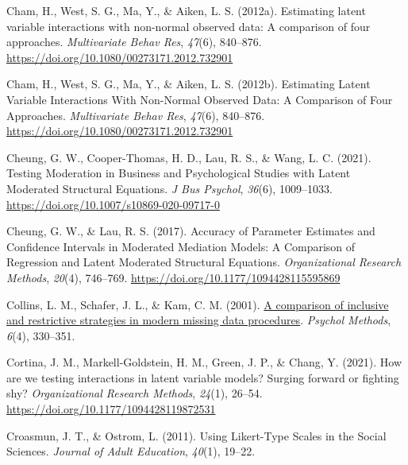 \documentclass[
  man]{apa6}
\newlength{\cslhangindent}
\newlength{\cslentryspacingunit} %
\newenvironment{CSLReferences}[2] %
 {%
  \setlength{\parindent}{0pt}
  \ifodd #1
  \let\oldpar\par
  \def\par{\hangindent=\cslhangindent\oldpar}
  \fi
  \setlength{\parskip}{#2\cslentryspacingunit}
 }%
 {}
\begin{document}
\begin{CSLReferences}{1}{0}
\leavevmode{}%
Cham, H., West, S. G., Ma, Y., \& Aiken, L. S. (2012a). Estimating latent variable interactions with non-normal observed data: {A} comparison of four approaches. \emph{Multivariate Behav Res}, \emph{47}(6), 840--876. \url{https://doi.org/10.1080/00273171.2012.732901}

\leavevmode{}%
Cham, H., West, S. G., Ma, Y., \& Aiken, L. S. (2012b). Estimating {Latent Variable Interactions With Non-Normal Observed Data}: {A Comparison} of {Four Approaches}. \emph{Multivariate Behav Res}, \emph{47}(6), 840--876. \url{https://doi.org/10.1080/00273171.2012.732901}

\leavevmode{}%
Cheung, G. W., Cooper-Thomas, H. D., Lau, R. S., \& Wang, L. C. (2021). Testing {Moderation} in {Business} and {Psychological Studies} with {Latent Moderated Structural Equations}. \emph{J Bus Psychol}, \emph{36}(6), 1009--1033. \url{https://doi.org/10.1007/s10869-020-09717-0}

\leavevmode{}%
Cheung, G. W., \& Lau, R. S. (2017). Accuracy of {Parameter Estimates} and {Confidence Intervals} in {Moderated Mediation Models}: {A Comparison} of {Regression} and {Latent Moderated Structural Equations}. \emph{Organizational Research Methods}, \emph{20}(4), 746--769. \url{https://doi.org/10.1177/1094428115595869}

\leavevmode{}%
Collins, L. M., Schafer, J. L., \& Kam, C. M. (2001). \href{https://www.ncbi.nlm.nih.gov/pubmed/11778676}{A comparison of inclusive and restrictive strategies in modern missing data procedures}. \emph{Psychol Methods}, \emph{6}(4), 330--351.

\leavevmode{}%
Cortina, J. M., Markell-Goldstein, H. M., Green, J. P., \& Chang, Y. (2021). How are we testing interactions in latent variable models? {Surging} forward or fighting shy? \emph{Organizational Research Methods}, \emph{24}(1), 26--54. \url{https://doi.org/10.1177/1094428119872531}

\leavevmode{}%
Croasmun, J. T., \& Ostrom, L. (2011). Using {Likert-Type Scales} in the {Social Sciences}. \emph{Journal of Adult Education}, \emph{40}(1), 19--22.


\end{CSLReferences}
\end{document}

